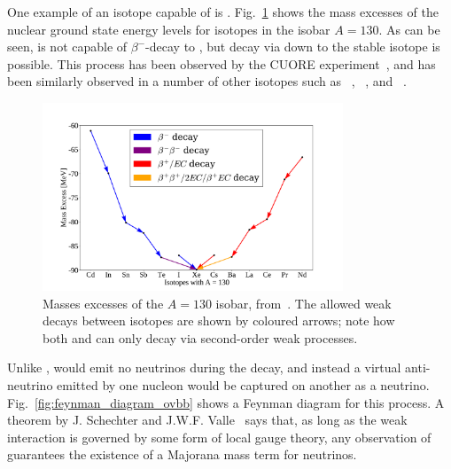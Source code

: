 One example of an isotope capable of \twonbb{} is . Fig.~\ref{fig:bb_isobar_example} shows the mass excesses of the nuclear ground state energy levels for isotopes in the isobar $A = 130$. As can be seen,  is not capable of $\beta^{-}$-decay to , but decay via \twonbb{} down to the stable isotope  is possible. This process has been observed by the CUORE experiment~\cite{adamsMeasurementEnsuremathNu2021}, %
and \twonbb{} has been similarly observed in a number of other isotopes such as ~\cite{agostiniResultsBetaBeta2015}, %
~\cite{gandoPrecisionAnalysis1362019}, %
and ~\cite{arnoldMeasurementEnsuremathNu2016}. %

\begin{figure}[!th]
    \centering
    \includegraphics[width=0.8\textwidth]{1_NeutrinoTheory/Figs/A_130_isobars.pdf}
    \caption[Masses excesses of the $A = 130$ isobar, with the allowed weak decays being shown]
    {Masses excesses of the $A = 130$ isobar, from~\cite{kondevNuclearDataSheets2008}. The allowed weak decays between isotopes are shown by coloured arrows; note how both  and  can only decay via second-order weak processes.}
    \label{fig:bb_isobar_example}
\end{figure}

Unlike \twonbb{}, \onbb{} would emit no neutrinos during the decay, and instead a virtual anti-neutrino emitted by one nucleon would be captured on another as a neutrino. Fig.~\ref{fig:feynman_diagram_ovbb} shows a Feynman diagram for this process. A theorem by J. Schechter and J.W.F. Valle~\cite{schechterNeutrinolessDoubleDecay1982} %
says that, as long as the weak interaction is governed by some form of local gauge theory, any observation of \onbb{} guarantees the existence of a Majorana mass term for neutrinos.

